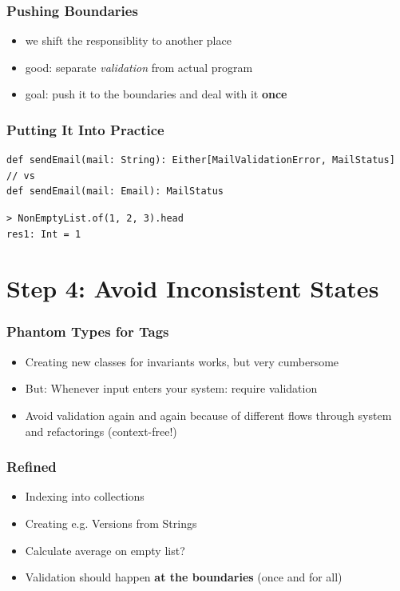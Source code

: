 \documentclass{beamer}
\begin{document}
\begin{frame}
  \frametitle{Pushing Boundaries}
  \begin{itemize}
  \item we shift the responsiblity to another place
  \item good: separate \textit{validation} from actual program
  \item goal: push it to the boundaries and deal with it \textbf{once}
  \end{itemize}
\end{frame}

\begin{frame}
  \frametitle{Putting It Into Practice}
\begin{verbatim}
def sendEmail(mail: String): Either[MailValidationError, MailStatus]
// vs
def sendEmail(mail: Email): MailStatus
\end{verbatim}
\begin{verbatim}
> NonEmptyList.of(1, 2, 3).head
res1: Int = 1
\end{verbatim}
\end{frame}

\section{Step 4: Avoid Inconsistent States}

\begin{frame}
  \frametitle{Phantom Types for Tags}
  \begin{itemize}
  \item Creating new classes for invariants works, but very cumbersome
  \item But: Whenever input enters your system: require validation
  \item Avoid validation again and again because of different flows
    through system and refactorings (context-free!)
  \end{itemize}
\end{frame}

\begin{frame}
  \frametitle{Refined}
  \begin{itemize}
  \item Indexing into collections
  \item Creating e.g. Versions from Strings
  \item Calculate average on empty list?
  \item Validation should happen \textbf{at the boundaries} (once and
    for all)
  \end{itemize}
\end{frame}
\end{document}
